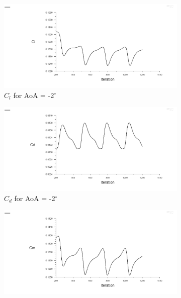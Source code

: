 \begin{figure}[H]
  \begin{subfigure}[b]{0.5\textwidth}
    \includegraphics[width=\textwidth]{-2_deg/AoA_-2_cl.png}
    \caption{$C_l$ for AoA = -2$^\circ$}
    \label{fig:aoa_-2_cl}
  \end{subfigure}
  \hfill
  \begin{subfigure}[b]{0.5\textwidth}
    \includegraphics[width=\textwidth]{-2_deg/AoA_-2_cd.png}
    \caption{$C_d$ for AoA = -2$^\circ$}
    \label{fig:aoa_-2_cd}
  \end{subfigure}
  \begin{subfigure}[b]{0.5\textwidth}
    \includegraphics[width=\textwidth]{-2_deg/AoA_-2_cm.png}

\end{subfigure}
\end{figure}
